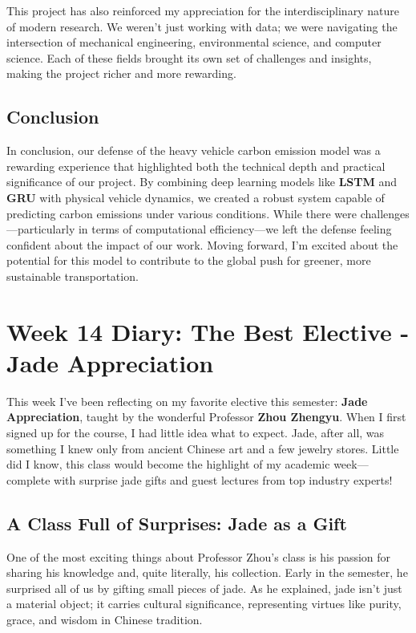 \documentclass[a4paper]{article} 	%
\begin{document}
This project has also reinforced my appreciation for the interdisciplinary nature of modern research. We weren’t just working with data; we were navigating the intersection of mechanical engineering, environmental science, and computer science. Each of these fields brought its own set of challenges and insights, making the project richer and more rewarding.

\subsection*{Conclusion}

In conclusion, our defense of the heavy vehicle carbon emission model was a rewarding experience that highlighted both the technical depth and practical significance of our project. By combining deep learning models like \textbf{LSTM} and \textbf{GRU} with physical vehicle dynamics, we created a robust system capable of predicting carbon emissions under various conditions. While there were challenges—particularly in terms of computational efficiency—we left the defense feeling confident about the impact of our work. Moving forward, I’m excited about the potential for this model to contribute to the global push for greener, more sustainable transportation.

\section{Week 14 Diary: The Best Elective - Jade Appreciation}

This week I’ve been reflecting on my favorite elective this semester: \textbf{Jade Appreciation}, taught by the wonderful Professor \textbf{Zhou Zhengyu}. When I first signed up for the course, I had little idea what to expect. Jade, after all, was something I knew only from ancient Chinese art and a few jewelry stores. Little did I know, this class would become the highlight of my academic week—complete with surprise jade gifts and guest lectures from top industry experts!

\subsection*{A Class Full of Surprises: Jade as a Gift}

One of the most exciting things about Professor Zhou’s class is his passion for sharing his knowledge and, quite literally, his collection. Early in the semester, he surprised all of us by gifting small pieces of jade. As he explained, jade isn’t just a material object; it carries cultural significance, representing virtues like purity, grace, and wisdom in Chinese tradition.
\end{document}
